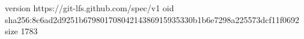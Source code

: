 version https://git-lfs.github.com/spec/v1
oid sha256:8c6ad2d9251b67980170804214386915935330b1b6e7298a225573dcf11f0692
size 1783

